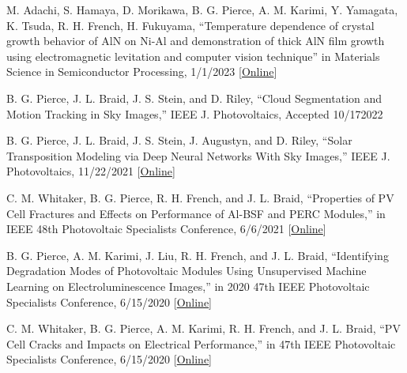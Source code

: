 \documentclass[10pt]{article}
\begin{document}
	{\begin{newitemize}
    
     \item{M. Adachi, S. Hamaya, D. Morikawa, { B. G. Pierce}, A. M. Karimi, Y. Yamagata, K. Tsuda, R. H. French,  H. Fukuyama, ``Temperature dependence of crystal growth behavior of AlN on Ni-Al and demonstration of thick AlN film growth using electromagnetic levitation and computer vision technique'' in Materials Science in Semiconductor Processing, 1/1/2023 [\href{https://www.sciencedirect.com/science/article/pii/S136980012200693X}{Online}] }
    
     \item{{ B. G. Pierce}, J. L. Braid, J. S. Stein, and D. Riley, ``Cloud Segmentation and Motion Tracking in Sky Images,” IEEE J. Photovoltaics, Accepted 10/172022  }
   
    \item{{ B. G. Pierce}, J. L. Braid, J. S. Stein, J. Augustyn, and D. Riley, ``Solar Transposition Modeling via Deep Neural Networks With Sky Images,” IEEE J. Photovoltaics, 11/22/2021 [\href{https://ieeexplore.ieee.org/abstract/document/9623380}{Online}] }
    
     \item{C. M. Whitaker, { B. G. Pierce}, R. H. French, and J. L. Braid, ``Properties of PV Cell Fractures and Effects on Performance of Al-BSF and PERC Modules,” in IEEE 48th Photovoltaic Specialists Conference, 6/6/2021 [\href{https://ieeexplore.ieee.org/abstract/document/9519030}{Online}] }
    
    \item {{ B. G. Pierce}, A. M. Karimi, J. Liu, R. H. French, and J. L. Braid, ``Identifying Degradation Modes of Photovoltaic Modules Using Unsupervised Machine Learning on Electroluminescence Images,'' in 2020 47th IEEE Photovoltaic Specialists Conference, 6/15/2020 [\href{https://ieeexplore.ieee.org/abstract/document/9301021}{Online}] }
    
    
    \item{C. M. Whitaker, { B. G. Pierce}, A. M. Karimi, R. H. French, and J. L. Braid, ``PV Cell Cracks and Impacts on Electrical Performance,'' in 47th IEEE Photovoltaic Specialists Conference, 6/15/2020 [\href{https://ieeexplore.ieee.org/abstract/document/9300374}{Online}] } 
    


\end{newitemize}}
\end{document}
